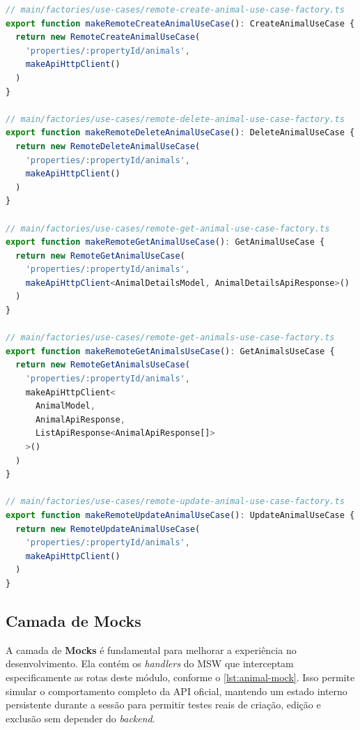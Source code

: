 \begin{center}
\end{center}
\vspace{-1.5\baselineskip}
\begin{lstlisting}[language=TypeScript]
// main/factories/use-cases/remote-create-animal-use-case-factory.ts
export function makeRemoteCreateAnimalUseCase(): CreateAnimalUseCase {
  return new RemoteCreateAnimalUseCase(
    'properties/:propertyId/animals',
    makeApiHttpClient()
  )
}

// main/factories/use-cases/remote-delete-animal-use-case-factory.ts
export function makeRemoteDeleteAnimalUseCase(): DeleteAnimalUseCase {
  return new RemoteDeleteAnimalUseCase(
    'properties/:propertyId/animals',
    makeApiHttpClient()
  )
}

// main/factories/use-cases/remote-get-animal-use-case-factory.ts
export function makeRemoteGetAnimalUseCase(): GetAnimalUseCase {
  return new RemoteGetAnimalUseCase(
    'properties/:propertyId/animals',
    makeApiHttpClient<AnimalDetailsModel, AnimalDetailsApiResponse>()
  )
}

// main/factories/use-cases/remote-get-animals-use-case-factory.ts
export function makeRemoteGetAnimalsUseCase(): GetAnimalsUseCase {
  return new RemoteGetAnimalsUseCase(
    'properties/:propertyId/animals',
    makeApiHttpClient<
      AnimalModel,
      AnimalApiResponse,
      ListApiResponse<AnimalApiResponse[]>
    >()
  )
}

// main/factories/use-cases/remote-update-animal-use-case-factory.ts
export function makeRemoteUpdateAnimalUseCase(): UpdateAnimalUseCase {
  return new RemoteUpdateAnimalUseCase(
    'properties/:propertyId/animals',
    makeApiHttpClient()
  )
}
\end{lstlisting}
\vspace{-0.5\baselineskip}
\begin{center}
\begingroup{}\fonte{}\endgroup
\end{center}

\subsection{Camada de Mocks}\label{subsec:camadaMocks}

A camada de \textbf{Mocks} é fundamental para melhorar a experiência no desenvolvimento. Ela contém os \textit{handlers} do \gls{MSW} que interceptam especificamente as rotas deste módulo, conforme o \autoref{lst:animal-mock}. Isso permite simular o comportamento completo da \gls{API} oficial, mantendo um estado interno persistente durante a sessão para permitir testes reais de criação, edição e exclusão sem depender do \textit{backend}.

